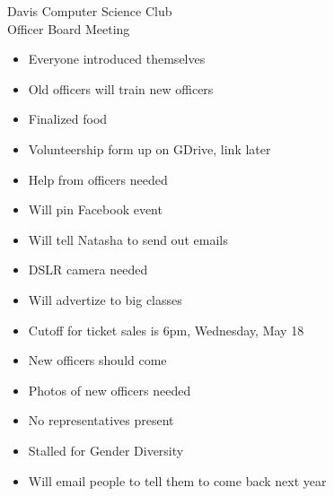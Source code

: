 \documentclass{article}
\begin{document}
\begin{Minutes}{Davis Computer Science Club\\Officer Board Meeting}




\maketitle

\begin{itemize}
  \item Everyone introduced themselves
  \item Old officers will train new officers
\end{itemize}

\begin{itemize}
  \item Finalized food
  \item Volunteership form up on GDrive, link later
  \item Help from officers needed
  \item Will pin Facebook event
  \item Will tell Natasha to send out emails
  \item DSLR camera needed
  \item Will advertize to big classes
  \item Cutoff for ticket sales is 6pm, Wednesday, May 18
  \item New officers should come
  \item Photos of new officers needed
\end{itemize}

\begin {itemize}
  \item No representatives present
  \item Stalled for Gender Diversity
  \item Will email people to tell them to come back next year
\end {itemize}


\end{Minutes}
\end{document}
